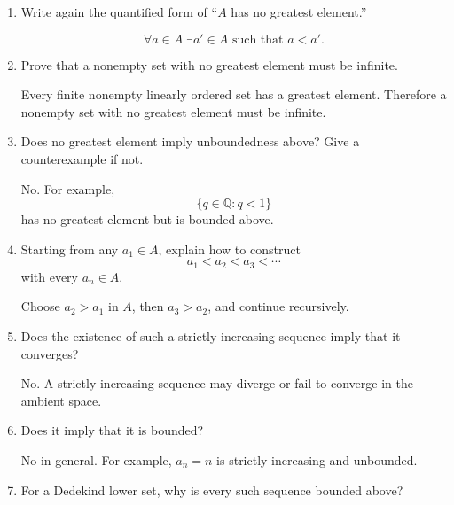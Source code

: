 \documentclass{self-check}
\begin{document}
\begin{enumerate}[label=\arabic*., itemsep=10pt]

\item Write again the quantified form of ``$A$ has no greatest element.''

\begin{answer}
\[
\forall a\in A\;\exists a'\in A\text{ such that }a<a'.
\]
\end{answer}

\item Prove that a nonempty set with no greatest element must be infinite.

\begin{answer}
Every finite nonempty linearly ordered set has a greatest element. Therefore a nonempty set with no greatest element must be infinite.
\end{answer}

\item Does no greatest element imply unboundedness above? Give a counterexample if not.

\begin{answer}
No. For example,
\[
\{q\in\mathbb{Q}:q<1\}
\]
has no greatest element but is bounded above.
\end{answer}

\item Starting from any $a_1\in A$, explain how to construct
\[
a_1<a_2<a_3<\cdots
\]
with every $a_n\in A$.

\begin{answer}
Choose $a_2>a_1$ in $A$, then $a_3>a_2$, and continue recursively.
\end{answer}

\item Does the existence of such a strictly increasing sequence imply that it converges?

\begin{answer}
No. A strictly increasing sequence may diverge or fail to converge in the ambient space.
\end{answer}

\item Does it imply that it is bounded?

\begin{answer}
No in general. For example, $a_n=n$ is strictly increasing and unbounded.
\end{answer}

\item For a Dedekind lower set, why is every such sequence bounded above?


\end{enumerate}
\end{document}
